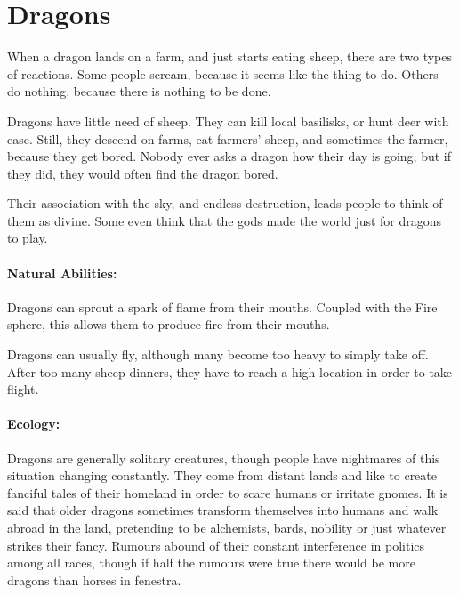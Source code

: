 \section{Dragons}
\label{dragon}

\begin{multicols}{2}


\noindent
When a dragon lands on a farm, and just starts eating sheep, there are two types of reactions.
Some people scream, because it seems like the thing to do.
Others do nothing, because there is nothing to be done.

Dragons have little need of sheep.
They can kill local basilisks, or hunt deer with ease.
Still, they descend on farms, eat farmers' sheep, and sometimes the farmer, because they get bored.
Nobody ever asks a dragon how their day is going, but if they did, they would often find the dragon bored.

Their association with the sky, and endless destruction, leads people to think of them as divine.
Some even think that the gods made the world just for dragons to play.

\paragraph{Natural Abilities:}
Dragons can sprout a spark of flame from their mouths.
Coupled with the Fire sphere, this allows them to produce fire from their mouths.

Dragons can usually fly, although many become too heavy to simply take off.
After too many sheep dinners, they have to reach a high location in order to take flight.

\paragraph{Ecology:} Dragons are generally solitary creatures, though people have nightmares of this situation changing constantly.
They come from distant lands and like to create fanciful tales of their homeland in order to scare humans or irritate gnomes.
It is said that older dragons sometimes transform themselves into humans and walk abroad in the land, pretending to be alchemists, bards, nobility or just whatever strikes their fancy.
Rumours abound of their constant interference in politics among all races, though if half the rumours were true there would be more dragons than horses in \gls{fenestra}.


\end{multicols}
